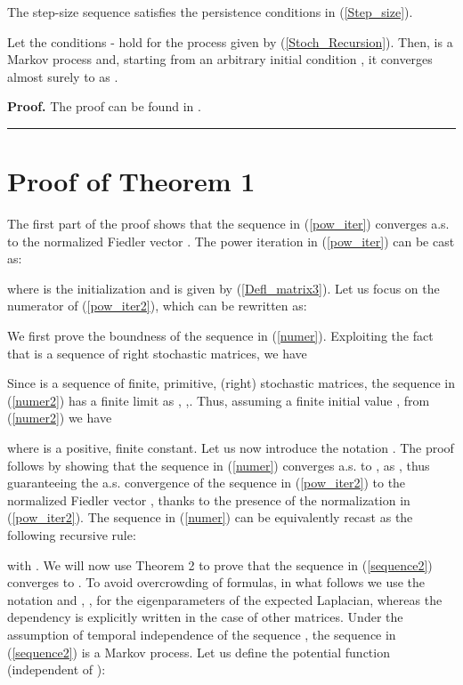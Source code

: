 \documentclass[10pt,twocolumn]{IEEEtran}
\newenvironment{proof}[1][Proof]{\noindent \textbf{#1.} }{\qedsymbol}
\newcommand{\qedsymbol}{\hspace{\fill}\rule{1.5ex}{1.5ex}}
\begin{document}
 The step-size sequence  satisfies the persistence conditions in (\ref{Step_size}).

Let the conditions - hold for the process  given by (\ref{Stoch_Recursion}). Then,  is a Markov process and, starting from an arbitrary initial condition , it converges almost surely to  as .

\begin{proof}
The proof can be found in \cite{Nevel}.
\end{proof}



\section{Proof of Theorem 1}

The first part of the proof shows that the sequence  in (\ref{pow_iter}) converges a.s. to the normalized Fiedler vector . The power iteration in (\ref{pow_iter}) can be cast as:

where  is the initialization and  is given by (\ref{Defl_matrix3}).
Let us focus on the numerator of (\ref{pow_iter2}), which can be rewritten as:

We first prove the boundness of the sequence  in (\ref{numer}). Exploiting the fact that  is a sequence of right stochastic matrices, we have

Since  is a sequence of finite, primitive, (right) stochastic matrices, the sequence  in (\ref{numer2}) has a finite limit as , \cite{Olfati1},\cite{Wolfowitz}. Thus, assuming a finite initial value , from (\ref{numer2}) we have

where  is a positive, finite constant.  Let us now introduce the notation . The proof follows by showing that the sequence  in (\ref{numer}) converges a.s. to , as , thus guaranteeing the a.s. convergence of the sequence  in (\ref{pow_iter2}) to the normalized Fiedler vector , thanks to the presence of the normalization in (\ref{pow_iter2}). The sequence  in (\ref{numer}) can be equivalently recast as the following recursive rule:

with . We will now use Theorem 2 to prove that the sequence in (\ref{sequence2}) converges to . To avoid overcrowding of formulas, in what follows we use the notation  and , , for the eigenparameters of the expected Laplacian, whereas the dependency is explicitly written in the case of other matrices. Under the assumption of temporal independence of the sequence , the sequence  in (\ref{sequence2}) is a Markov process. Let us define the potential function (independent of ):
\end{document}
